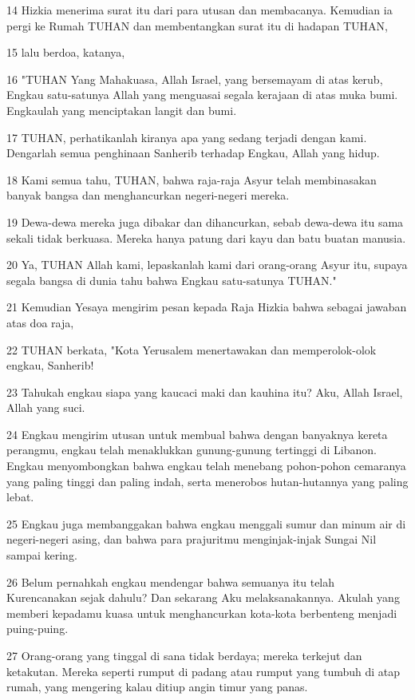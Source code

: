 \par 14 Hizkia menerima surat itu dari para utusan dan membacanya. Kemudian ia pergi ke Rumah TUHAN dan membentangkan surat itu di hadapan TUHAN,
\par 15 lalu berdoa, katanya,
\par 16 "TUHAN Yang Mahakuasa, Allah Israel, yang bersemayam di atas kerub, Engkau satu-satunya Allah yang menguasai segala kerajaan di atas muka bumi. Engkaulah yang menciptakan langit dan bumi.
\par 17 TUHAN, perhatikanlah kiranya apa yang sedang terjadi dengan kami. Dengarlah semua penghinaan Sanherib terhadap Engkau, Allah yang hidup.
\par 18 Kami semua tahu, TUHAN, bahwa raja-raja Asyur telah membinasakan banyak bangsa dan menghancurkan negeri-negeri mereka.
\par 19 Dewa-dewa mereka juga dibakar dan dihancurkan, sebab dewa-dewa itu sama sekali tidak berkuasa. Mereka hanya patung dari kayu dan batu buatan manusia.
\par 20 Ya, TUHAN Allah kami, lepaskanlah kami dari orang-orang Asyur itu, supaya segala bangsa di dunia tahu bahwa Engkau satu-satunya TUHAN."
\par 21 Kemudian Yesaya mengirim pesan kepada Raja Hizkia bahwa sebagai jawaban atas doa raja,
\par 22 TUHAN berkata, "Kota Yerusalem menertawakan dan memperolok-olok engkau, Sanherib!
\par 23 Tahukah engkau siapa yang kaucaci maki dan kauhina itu? Aku, Allah Israel, Allah yang suci.
\par 24 Engkau mengirim utusan untuk membual bahwa dengan banyaknya kereta perangmu, engkau telah menaklukkan gunung-gunung tertinggi di Libanon. Engkau menyombongkan bahwa engkau telah menebang pohon-pohon cemaranya yang paling tinggi dan paling indah, serta menerobos hutan-hutannya yang paling lebat.
\par 25 Engkau juga membanggakan bahwa engkau menggali sumur dan minum air di negeri-negeri asing, dan bahwa para prajuritmu menginjak-injak Sungai Nil sampai kering.
\par 26 Belum pernahkah engkau mendengar bahwa semuanya itu telah Kurencanakan sejak dahulu? Dan sekarang Aku melaksanakannya. Akulah yang memberi kepadamu kuasa untuk menghancurkan kota-kota berbenteng menjadi puing-puing.
\par 27 Orang-orang yang tinggal di sana tidak berdaya; mereka terkejut dan ketakutan. Mereka seperti rumput di padang atau rumput yang tumbuh di atap rumah, yang mengering kalau ditiup angin timur yang panas.
